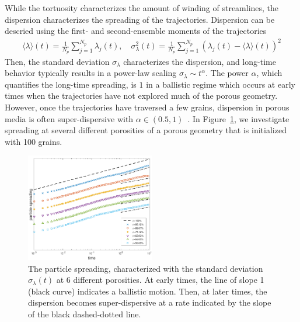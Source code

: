 \documentclass[11pt]{article}
\begin{document}
While the tortuosity characterizes the amount of winding of streamlines,
the dispersion characterizes the spreading of the trajectories.
Dispersion can be descried using the first- and second-ensemble moments
of the trajectories
\begin{align}
  \langle \lambda \rangle (t) = \frac{1}{N_p} \sum_{j=1}^{N_p}
    \lambda_j(t), \quad \sigma_\lambda^{2}(t) = \frac{1}{N_p}
    \sum_{j=1}^{N_p} (\lambda_j(t) - \langle \lambda \rangle(t))^2
\end{align}
Then, the standard deviation $\sigma_\lambda$ characterizes the
dispersion, and long-time behavior typically results in a power-law
scaling $\sigma_\lambda \sim t^{\alpha}$. The power $\alpha$, which
quantifies the long-time spreading, is $1$ in a ballistic regime which
occurs at early times when the trajectories have not explored much of
the porous geometry. However, once the trajectories have traversed a few
grains, dispersion in porous media is often super-dispersive with
$\alpha \in (0.5,1)$~\cite{}. In Figure~\ref{fig:100dispersion}, we
investigate spreading at several different porosities of a porous
geometry that is initialized with 100 grains.

\begin{figure}
  \includegraphics[width=0.5\textwidth]{figs/100b_second_moment_long_ref}
  \caption{\label{fig:100dispersion} The particle spreading,
  characterized with the standard deviation $\sigma_\lambda(t)$ at 6
  different porosities. At early times, the line of slope 1 (black
  curve) indicates a ballistic motion. Then, at later times, the
  dispersion becomes super-dispersive at a rate indicated by the slope
  of the black dashed-dotted line.}
\end{figure}
\end{document}

